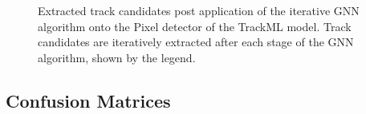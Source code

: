 \begin{figure}[htbp]%
    \centering
    \hfill
    \caption{Extracted track candidates post application of the iterative GNN algorithm onto the Pixel detector of the TrackML model. Track candidates are iteratively extracted after each stage of the GNN algorithm, shown by the legend.}%
    \label{fig:trackml-results-barrel-endcap}%
\end{figure}






\subsection{Confusion Matrices}

